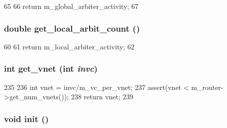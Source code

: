 \begin{DoxyCode}
65     {
66         return m_global_arbiter_activity;
67     }
\end{DoxyCode}
\hypertarget{classSWallocator__d_a23b4a72d39fe6a47f8e896c3ba267426}{
\subsubsection[{get\_\-local\_\-arbit\_\-count}]{\setlength{\rightskip}{0pt plus 5cm}double get\_\-local\_\-arbit\_\-count ()}}
\label{classSWallocator__d_a23b4a72d39fe6a47f8e896c3ba267426}



\begin{DoxyCode}
60     {
61         return m_local_arbiter_activity;
62     }
\end{DoxyCode}
\hypertarget{classSWallocator__d_afdff1bb4dda9168cb4bf8b78aa0cf9d8}{
\subsubsection[{get\_\-vnet}]{\setlength{\rightskip}{0pt plus 5cm}int get\_\-vnet (int {\em invc})}}
\label{classSWallocator__d_afdff1bb4dda9168cb4bf8b78aa0cf9d8}



\begin{DoxyCode}
235 {
236     int vnet = invc/m_vc_per_vnet;
237     assert(vnet < m_router->get_num_vnets());
238     return vnet;
239 }
\end{DoxyCode}
\hypertarget{classSWallocator__d_a02fd73d861ef2e4aabb38c0c9ff82947}{
\subsubsection[{init}]{\setlength{\rightskip}{0pt plus 5cm}void init ()}}
\label{classSWallocator__d_a02fd73d861ef2e4aabb38c0c9ff82947}



